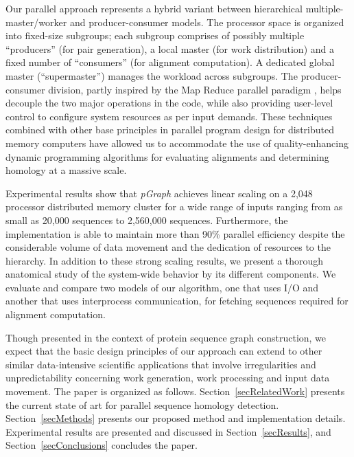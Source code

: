 \documentclass[10pt,journal,letterpaper,compsoc]{IEEEtran}
\begin{document}
Our parallel approach represents a hybrid variant between hierarchical multiple-master/worker and producer-consumer models. The processor space is organized into fixed-size subgroups; each subgroup comprises of possibly multiple ``producers'' (for pair generation), a local master (for work distribution) and a fixed number of ``consumers'' (for alignment computation). A dedicated global master (``supermaster'') manages the workload across subgroups. The producer-consumer division, partly inspired by the Map Reduce parallel paradigm \cite{Dean08}, helps decouple the two major operations in the code, while also providing user-level control to configure system resources as per input demands. These techniques combined with other base principles in parallel program design for distributed memory computers have allowed us to accommodate the use of quality-enhancing dynamic programming algorithms for evaluating alignments and determining homology at a massive scale. 

Experimental results show that {\it pGraph} achieves linear scaling on a 2,048 processor distributed memory cluster for a wide range of inputs ranging from as small as 20,000 sequences to 2,560,000 sequences. Furthermore, the implementation is able to maintain more than 90\% parallel efficiency despite the considerable volume of data movement and the dedication of resources to the hierarchy. In addition to these strong scaling results, we present a thorough anatomical study of the system-wide behavior by its different components. We evaluate and compare two models of our algorithm, one that uses I/O and another that uses interprocess communication, for fetching sequences required for alignment computation. 

Though presented in the context of protein sequence graph construction, we expect that the basic design principles of our approach can extend to other similar data-intensive scientific applications that involve irregularities and unpredictability concerning work generation, work processing and input data movement.
The paper is organized as follows. Section~\ref{secRelatedWork} presents the current state of art for parallel sequence homology detection. Section~\ref{secMethods} presents our proposed method and implementation details. Experimental results are presented and discussed in Section~\ref{secResults}, and Section~\ref{secConclusions} concludes the paper.
\end{document}
